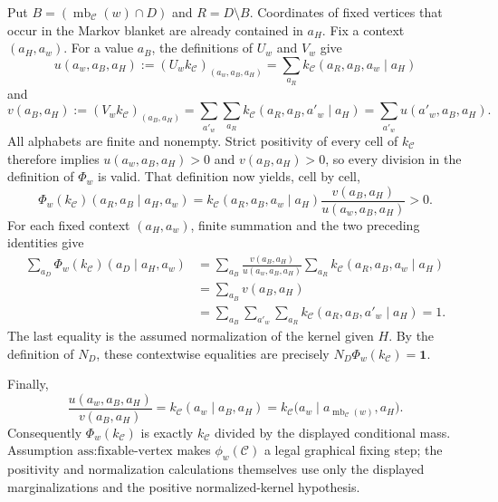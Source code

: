 Put \(B=(\operatorname{mb}_{\mathcal C}(w)\cap D)\) and \(R=D\setminus B\).  Coordinates of fixed vertices that occur in the Markov blanket are already contained in \(a_H\).  Fix a context \((a_H,a_w)\).  For a value \(a_B\), the definitions of \(U_w\) and \(V_w\) give
\[
 u(a_w,a_B,a_H):=(U_wk_{\mathcal C})_{(a_w,a_B,a_H)}
   =\sum_{a_R}k_{\mathcal C}(a_R,a_B,a_w\mid a_H)
\]
and
\[
 v(a_B,a_H):=(V_wk_{\mathcal C})_{(a_B,a_H)}
   =\sum_{a'_w}\sum_{a_R}k_{\mathcal C}(a_R,a_B,a'_w\mid a_H)
   =\sum_{a'_w}u(a'_w,a_B,a_H).
\]
All alphabets are finite and nonempty.  Strict positivity of every cell of \(k_{\mathcal C}\) therefore implies \(u(a_w,a_B,a_H)>0\) and \(v(a_B,a_H)>0\), so every division in the definition of \(\Phi_w\) is valid.  That definition now yields, cell by cell,
\[
 \Phi_w(k_{\mathcal C})(a_R,a_B\mid a_H,a_w)
 =k_{\mathcal C}(a_R,a_B,a_w\mid a_H)
   \frac{v(a_B,a_H)}{u(a_w,a_B,a_H)}>0.
\]
For each fixed context \((a_H,a_w)\), finite summation and the two preceding identities give
\[
\begin{aligned}
 \sum_{a_D}\Phi_w(k_{\mathcal C})(a_D\mid a_H,a_w)
 &=\sum_{a_B}\frac{v(a_B,a_H)}{u(a_w,a_B,a_H)}
     \sum_{a_R}k_{\mathcal C}(a_R,a_B,a_w\mid a_H)\\
 &=\sum_{a_B}v(a_B,a_H)\\
 &=\sum_{a_B}\sum_{a'_w}\sum_{a_R}
     k_{\mathcal C}(a_R,a_B,a'_w\mid a_H)=1.
\end{aligned}
\]
The last equality is the assumed normalization of the kernel given \(H\).  By the definition of \(N_D\), these contextwise equalities are precisely \(N_D\Phi_w(k_{\mathcal C})=\mathbf 1\).

Finally,
\[
 \frac{u(a_w,a_B,a_H)}{v(a_B,a_H)}
 =k_{\mathcal C}(a_w\mid a_B,a_H)
 =k_{\mathcal C}\bigl(a_w\mid
   a_{\operatorname{mb}_{\mathcal C}(w)},a_H\bigr).
\]
Consequently \(\Phi_w(k_{\mathcal C})\) is exactly \(k_{\mathcal C}\) divided by the displayed conditional mass.  Assumption \(\text{ass:fixable-vertex}\) makes \(\phi_w(\mathcal C)\) a legal graphical fixing step; the positivity and normalization calculations themselves use only the displayed marginalizations and the positive normalized-kernel hypothesis.